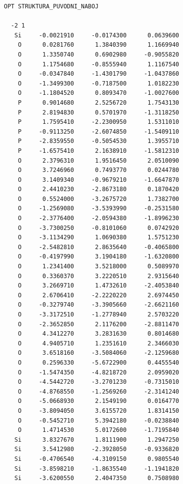 \documentclass[
  digital, %
  table,   %
  lof,     %
  lot,     %
  oneside,
]{fithesis3}
\begin{document}
  \begin{lstlisting}[frame=single, caption={puvodni struktura puvodni methyl },label=DescriptiveLabel]
  OPT STRUKTURA_PUVODNI_NABOJ

  -2 1
   Si     -0.0021910     -0.0174300      0.0639600
    O      0.0281760      1.3840390      1.1669940
    O      1.3350740      0.6902980     -0.9055820
    O      1.1754680     -0.8555940      1.1167540
    O     -0.0347840     -1.4301790     -1.0437860
    O     -1.3499300     -0.7187500      1.0182230
    O     -1.1804520      0.8093470     -1.0027600
    P      0.9014680      2.5256720      1.7543130
    P      2.8194830      0.5701970     -1.3118250
    P      1.7595410     -2.2300950      1.5311010
    P     -0.9113250     -2.6074850     -1.5409110
    P     -2.8359550     -0.5054530      1.3955710
    P     -1.6575410      2.1638910     -1.5812310
    O      2.3796310      1.9516450      2.0510090
    O      3.7246960      0.7493770      0.0244780
    O      3.1409340     -0.9679210     -1.6647870
    O      2.4410230     -2.8673180      0.1870420
    O      0.5524000     -3.2675720      1.7382700
    O     -1.2569080     -3.5393990     -0.2531580
    O     -2.3776400     -2.0594380     -1.8996230
    O     -3.7300250     -0.8101060      0.0742920
    O     -3.1134290      1.0690380      1.5751230
    O     -2.5482810      2.8635640     -0.4065800
    O     -0.4197990      3.1904180     -1.6320800
    O      1.2341400      3.5218000      0.5089970
    O      0.3360370      3.2220510      2.9315640
    O      3.2669710      1.4732610     -2.4053840
    O      2.6706410     -2.2220220      2.6974450
    O     -0.3279740     -3.3905660     -2.6621160
    O     -3.3172510     -1.2778940      2.5703220
    O     -2.3652850      2.1176200     -2.8811470
    O      4.3412270      3.2831630      0.8014680
    O      4.9405710      1.2351610      2.3466030
    O      3.6518160     -3.5084060     -2.1259680
    O      0.2596330     -5.6722900      0.4455540
    O     -1.5474350     -4.8218720      2.0959020
    O     -4.5442720     -3.2701230     -0.7315010
    O     -4.8768550     -1.2569260     -2.3141240
    O     -5.0668930      2.1549190      0.0164770
    O     -3.8094050      3.6155720      1.8314150
    O     -0.5452710      5.3942180     -0.0238840
    O      1.4714530      5.0172600     -1.7195840
   Si      3.8327670      1.8111900      1.2947250
   Si      3.5412980     -2.3928050     -0.9336820
   Si     -0.4706540     -4.3109150      0.9805540
   Si     -3.8598210     -1.8635540     -1.1941820
   Si     -3.6200550      2.4047350      0.7508980

\end{lstlisting}
\end{document}
